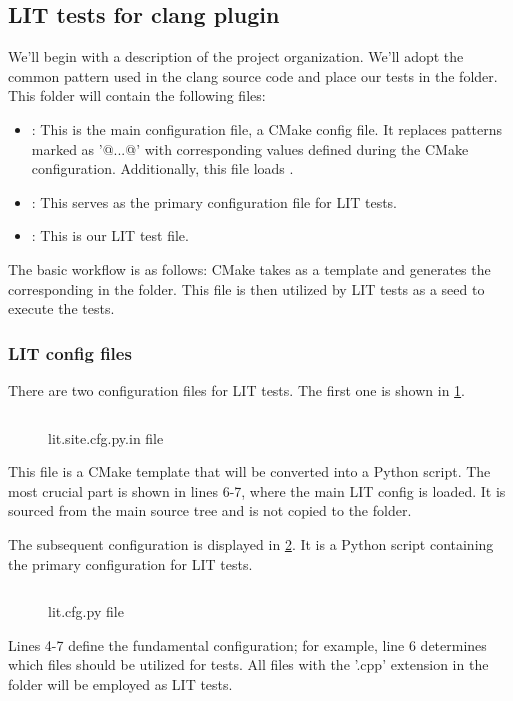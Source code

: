 \subsection{LIT tests for clang plugin}
\label{sec:part1:ch4:test_project:lit}
We'll begin with a description of the project organization. We'll adopt the
common pattern used in the clang source code and place our tests in the
 folder. This folder will contain the following files: 
\begin{itemize}
\item {}: This is the main configuration file, a CMake
  config file. It replaces patterns marked as '@...@' with corresponding values
  defined during the CMake configuration. Additionally, this file loads
  . 
\item {}: This serves as the primary configuration file for
  LIT tests. 
\item {}: This is our LIT test file.
\end{itemize}
The basic workflow is as follows: CMake takes  as a
template and generates the corresponding  in the
 folder. This file is then utilized by LIT tests as a seed
to execute the tests.

\subsubsection{LIT config files}
There are two configuration files for LIT tests. The first one is shown in
\cref{lis:ch4:ClassComplexityChecker:lit.site.cfg.py.in}. 
\begin{figure}[H]
  \inputminted{python}{src/part1/ch4_baselibs/classcomplexity/test/lit.site.cfg.py.in}
  \caption{lit.site.cfg.py.in file}
  \label{lis:ch4:ClassComplexityChecker:lit.site.cfg.py.in}
\end{figure}
This file is a CMake template that will be converted into a Python script. The
most crucial part is shown in lines 6-7, where the main LIT config is loaded. It
is sourced from the main source tree and is not copied to the 
folder. 

The subsequent configuration is displayed in
\cref{lis:ch4:ClassComplexityChecker:lit.cfg.py}. It is a Python script
containing the primary configuration for LIT tests. 
\begin{figure}[H]
  \inputminted{python}{src/part1/ch4_baselibs/classcomplexity/test/lit.cfg.py}
  \caption{lit.cfg.py file}
  \label{lis:ch4:ClassComplexityChecker:lit.cfg.py}
\end{figure}
Lines 4-7 define the fundamental configuration; for example, line 6 determines
which files should be utilized for tests. All files with the '.cpp' extension in
the  folder will be employed as LIT tests. 

